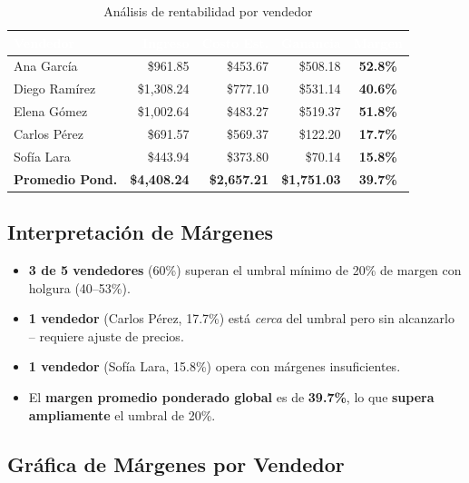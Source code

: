 \documentclass[12pt, a4paper]{article}
\begin{document}
\begin{table}[H]
\centering
\caption{Análisis de rentabilidad por vendedor}
\begin{tabular}{l r r r c}
\toprule
\rowcolor{tableheader}
\textcolor{white}{\textbf{Vendedor}} & \textcolor{white}{\textbf{Ingreso}} & \textcolor{white}{\textbf{Costo Est.}} & \textcolor{white}{\textbf{Ganancia}} & \textcolor{white}{\textbf{Margen}} \\
\midrule
Ana García & \$961.85 & \$453.67 & \$508.18 & \textcolor{successgreen}{\textbf{52.8\%}} \\
\rowcolor{rowalt}
Diego Ramírez & \$1,308.24 & \$777.10 & \$531.14 & \textcolor{successgreen}{\textbf{40.6\%}} \\
Elena Gómez & \$1,002.64 & \$483.27 & \$519.37 & \textcolor{successgreen}{\textbf{51.8\%}} \\
\rowcolor{rowalt}
Carlos Pérez & \$691.57 & \$569.37 & \$122.20 & \textcolor{warnorange}{\textbf{17.7\%}} \\
Sofía Lara & \$443.94 & \$373.80 & \$70.14 & \textcolor{dangered}{\textbf{15.8\%}} \\
\midrule
\textbf{Promedio Pond.} & \textbf{\$4,408.24} & \textbf{\$2,657.21} & \textbf{\$1,751.03} & \textbf{39.7\%} \\
\bottomrule
\end{tabular}
\end{table}

\subsection{Interpretación de Márgenes}

\begin{itemize}
    \item \textcolor{successgreen}{\textbf{3 de 5 vendedores}} (60\%) superan el umbral mínimo de 20\% de margen con holgura (40--53\%).
    \item \textcolor{warnorange}{\textbf{1 vendedor}} (Carlos Pérez, 17.7\%) está \textit{cerca} del umbral pero sin alcanzarlo -- requiere ajuste de precios.
    \item \textcolor{dangered}{\textbf{1 vendedor}} (Sofía Lara, 15.8\%) opera con márgenes insuficientes.
    \item El \textbf{margen promedio ponderado global} es de \textbf{39.7\%}, lo que \textbf{supera ampliamente} el umbral de 20\%.
\end{itemize}

\subsection{Gráfica de Márgenes por Vendedor}
\end{document}
